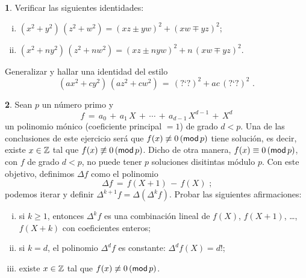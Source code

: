 \theoremstyle{definition}
\newtheorem{ejerFermat}{\ejername}[section]


\begin{ejerFermat}\label{ejer:fermat:identidades}
	Verificar las siguientes identidades:
	\begin{enumerate}[(i)]
		\item\label{item:ejer:fermat:identidades:cuadrados}
			\begin{math}
				(x^2+y^2)\,(z^2+w^2)=
					(xz\pm yw)^2+(xw\mp yz)^2
			\end{math};
		\item\label{item:ejer:fermat:identidades}
			\begin{math}
				(x^2+ny^2)\,(z^2+nw^2)=
					(xz\pm nyw)^2+n\,(xw\mp yz)^2
			\end{math}.
	\end{enumerate}
	Generalizar y hallar una identidad del estilo
	\begin{displaymath}
		(ax^2+cy^2)\,(az^2+cw^2)\,=\,(\text{?`?})^2+ac\,(\text{?`?})^2
		\text{ .}
	\end{displaymath}
\end{ejerFermat}

\begin{ejerFermat}\label{ejer:fermat:soluciones:euler}
	Sean $p$ un n\'umero primo y
	\begin{displaymath}
		f\,=\,a_0\,+\,a_1\,X\,+\,\cdots\,+\,a_{d-1}\,X^{d-1}\,+\,X^d
	\end{displaymath}
	un polinomio m\'onico (coeficiente principal $=1$) de grado $d<p$.
	Una de las conclusiones de este ejercicio ser\'a que
	$f(x)\not\equiv 0\tmodulo[p]$ tiene soluci\'on, es decir, existe
	$x\in\Enteros$ tal que $f(x)\not\equiv 0\tmodulo[p]$. Dicho de otra
	manera, $f(x)\equiv 0\tmodulo[p]$, con $f$ de grado $d<p$, no puede
	tener $p$ soluciones disitintas m\'odulo $p$.
	Con este objetivo, definimos $\Delta f$ como el polinomio
	\begin{displaymath}
		\Delta f\,=\,f(X+1)\,-\,f(X)
		\text{ ;}
	\end{displaymath}
	podemos iterar y definir $\Delta^{k+1}f=\Delta(\Delta^k f)$.
	Probar las siguientes afirmaciones:
	\begin{enumerate}[(i)]
		\item\label{item:ejer:fermat:soluciones:euler:i}
			si $k\geq 1$, entonces $\Delta^k f$ es una
			combinaci\'on lineal de $f(X)$, $f(X+1)$, \dots,
			$f(X+k)$ con coeficientes enteros;
		\item\label{item:ejer:fermat:soluciones:euler:ii}
			si $k=d$, el polinomio $\Delta^d f$ es constante:
			$\Delta^d f(X)=d!$;
		\item\label{item:ejer:fermat:soluciones:euler:iii}
			existe $x\in\Enteros$ tal que
			$f(x)\not\equiv 0\tmodulo[p]$.%
	\end{enumerate}
\end{ejerFermat}


